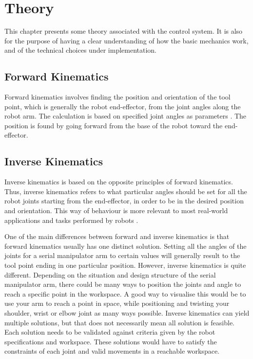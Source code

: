 \chapter{Theory}
\label{chap:theory}
This chapter presents some theory associated with the control system. It is also for the purpose of having a clear understanding of how the basic mechanics work, and of the technical choices under implementation. 

\section{Forward Kinematics}

Forward kinematics involves finding the position and orientation of the tool point, which is generally the robot end-effector, from the joint angles along the robot arm. The calculation is based on specified joint angles as parameters \cite{forward_kinematics}. The position is found by going forward from the base of the robot toward the end-effector. 

\section{Inverse Kinematics}

Inverse kinematics is based on the opposite principles of forward kinematics. Thus, inverse kinematics refers to what particular angles should be set for all the robot joints starting from the end-effector, in order to be in the desired position and orientation. This way of behaviour is more relevant to most real-world applications and tasks performed by robots \cite{inverse_kinematics}. 

One of the main differences between forward and inverse kinematics is that forward kinematics usually has one distinct solution. Setting all the angles of the joints for a serial manipulator arm to certain values will generally result to the tool point ending in one particular position. However, inverse kinematics is quite different. Depending on the situation and design structure of the serial manipulator arm, there could be many ways to position the joints and angle to reach a specific point in the workspace. A good way to visualise this would be to use your arm to reach a point in space, while positioning and twisting your shoulder, wrist or elbow joint as many ways possible. Inverse kinematics can yield multiple solutions, but that does not necessarily mean all solution is feasible. Each solution needs to be validated against criteria given by the robot specifications and workspace. These solutions would have to satisfy the constraints of each joint and valid movements in a reachable workspace.


